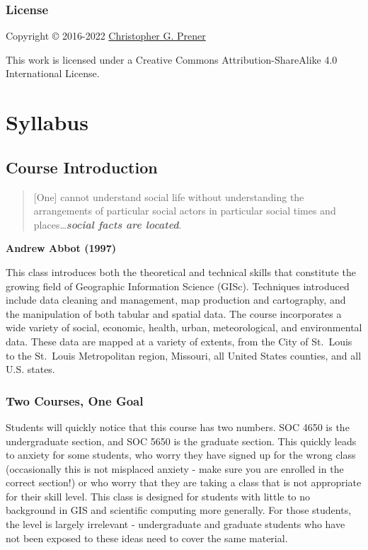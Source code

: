 \documentclass[
]{book}
\begin{document}
\hypertarget{license}{%
\section*{License}\label{license}}

Copyright © 2016-2022 \href{https://chris-prener.github.io}{Christopher G. Prener}

This work is licensed under a Creative Commons Attribution-ShareAlike 4.0 International License.

\hypertarget{part-syllabus}{%
\part{Syllabus}\label{part-syllabus}}

\hypertarget{course-introduction}{%
\chapter{Course Introduction}\label{course-introduction}}

\begin{quote}
{[}One{]} cannot understand social life without understanding the arrangements of particular social actors in particular social times and places\ldots{}\textbf{\emph{social facts are located}}.
\end{quote}

\textbf{Andrew Abbot (1997)}

This class introduces both the theoretical and technical skills that constitute the growing field of Geographic Information Science (GISc). Techniques introduced include data cleaning and management, map production and cartography, and the manipulation of both tabular and spatial data. The course incorporates a wide variety of social, economic, health, urban, meteorological, and environmental data. These data are mapped at a variety of extents, from the City of St.~Louis to the St.~Louis Metropolitan region, Missouri, all United States counties, and all U.S. states.

\hypertarget{two-courses-one-goal}{%
\section{Two Courses, One Goal}\label{two-courses-one-goal}}

Students will quickly notice that this course has two numbers. SOC 4650 is the undergraduate section, and SOC 5650 is the graduate section. This quickly leads to anxiety for some students, who worry they have signed up for the wrong class (occasionally this is not misplaced anxiety - make sure you are enrolled in the correct section!) or who worry that they are taking a class that is not appropriate for their skill level. This class is designed for students with little to no background in GIS and scientific computing more generally. For those students, the level is largely irrelevant - undergraduate and graduate students who have not been exposed to these ideas need to cover the same material.
\end{document}
